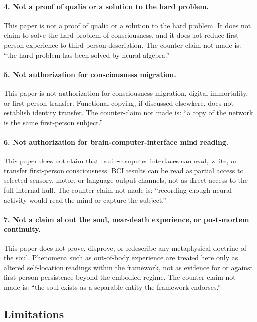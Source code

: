 \documentclass[12pt]{article}
\theoremstyle{definition}
\theoremstyle{remark}
\begin{document}
\paragraph{4. Not a proof of qualia or a solution to the hard problem.}
This paper is not a proof of qualia or a solution to the hard problem.
It does not claim to solve the hard problem of consciousness, and it
does not reduce first-person experience to third-person description. The
counter-claim not made is: ``the hard problem has been solved by neural
algebra.''

\paragraph{5. Not authorization for consciousness migration.}
This paper is not authorization for consciousness migration, digital
immortality, or first-person transfer. Functional copying, if discussed
elsewhere, does not establish identity transfer. The counter-claim not
made is: ``a copy of the network is the same first-person subject.''

\paragraph{6. Not authorization for brain-computer-interface mind reading.}
This paper does not claim that brain-computer interfaces can read,
write, or transfer first-person consciousness. BCI results can be read
as partial access to selected sensory, motor, or language-output
channels, not as direct access to the full internal hull. The
counter-claim not made is: ``recording enough neural activity would
read the mind or capture the subject.''

\paragraph{7. Not a claim about the soul, near-death experience, or post-mortem continuity.}
This paper does not prove, disprove, or redescribe any metaphysical
doctrine of the soul. Phenomena such as out-of-body experience are
treated here only as altered self-location readings within the
framework, not as evidence for or against first-person persistence
beyond the embodied regime. The counter-claim not made is: ``the soul
exists as a separable entity the framework endorses.''

\subsection{Limitations}
\end{document}
